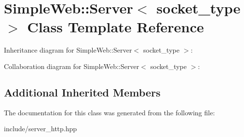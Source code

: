 \hypertarget{classSimpleWeb_1_1Server}{}\section{Simple\+Web\+:\+:Server$<$ socket\+\_\+type $>$ Class Template Reference}
\label{classSimpleWeb_1_1Server}


Inheritance diagram for Simple\+Web\+:\+:Server$<$ socket\+\_\+type $>$\+:


Collaboration diagram for Simple\+Web\+:\+:Server$<$ socket\+\_\+type $>$\+:
\subsection*{Additional Inherited Members}


The documentation for this class was generated from the following file\+:\begin{DoxyCompactItemize}
\item 
include/server\+\_\+http.\+hpp\end{DoxyCompactItemize}
